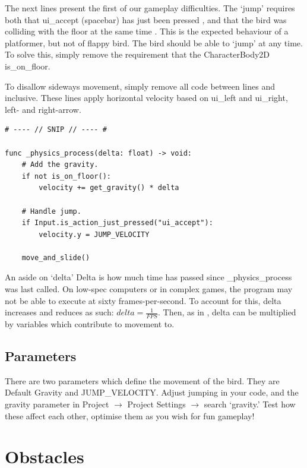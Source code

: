 \documentclass[14pt]{extarticle}
\newcommand{\encircle}[1]{\tikz[baseline=(char.base)]{\node[shape=circle,draw,inner sep=1pt] (char) {#1};}}
\begin{document}
The next lines present the first of our gameplay difficulties. The `jump' requires both that ui\_accept (spacebar) has just been pressed \encircle{14}, and that the bird was colliding with the floor at the same time \encircle{15}. This is the expected behaviour of a platformer, but not of flappy bird. The bird should be able to `jump' at any time. To solve this, simply remove the requirement that the CharacterBody2D is\_on\_floor.

To disallow sideways movement, simply remove all code between lines \encircle{18} and \encircle{26} inclusive. These lines apply horizontal velocity based on ui\_left and ui\_right, left- and right-arrow.

\begin{lstlisting}[language=gdscript, label={lst:simplified-controller}, caption=Inputs to suit flappy bird]
# ---- // SNIP // ---- #

func _physics_process(delta: float) -> void:
	# Add the gravity.
	if not is_on_floor():
		velocity += get_gravity() * delta

	# Handle jump.
	if Input.is_action_just_pressed("ui_accept"):
		velocity.y = JUMP_VELOCITY

	move_and_slide()
\end{lstlisting}

\begin{callout-note}{An aside on `delta'}
Delta is how much time has passed since \_physics\_process was last called. On low-spec computers or in complex games, the program may not be able to execute at sixty frames-per-second. To account for this, delta increases and reduces as such: $delta=\frac{1}{FPS}$. Then, as in \encircle{6}, delta can be multiplied by variables which contribute to movement to.
\end{callout-note}

\subsection*{Parameters}
There are two parameters which define the movement of the bird. They are Default Gravity and JUMP\_VELOCITY. Adjust jumping in your code, and the gravity parameter in Project $\rightarrow$ Project Settings $\rightarrow$ search `gravity.' Test how these affect each other, optimise them as you wish for fun gameplay!

\clearpage
\section{Obstacles}
\end{document}
